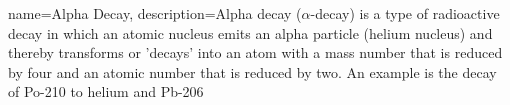 {
name=Alpha Decay,
    description={Alpha decay ($\alpha$-decay) is a type of radioactive decay in which an atomic nucleus emits an alpha particle (helium nucleus) and thereby transforms or 'decays' into an atom with a mass number that is reduced by four and an atomic number that is reduced by two.  An example is the decay of Po-210 to helium and Pb-206}
}
